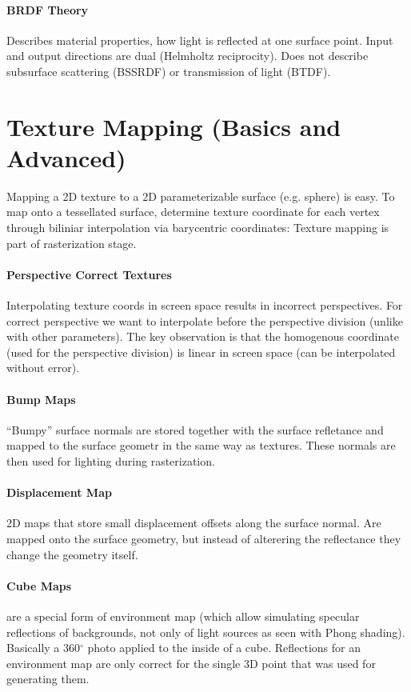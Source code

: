 \documentclass{article}
\begin{document}
\paragraph{BRDF Theory} Describes material properties, how light is reflected at one surface point. Input and output directions are dual (Helmholtz reciprocity). Does not describe subsurface scattering (BSSRDF) or transmission of light (BTDF).

\section{Texture Mapping (Basics and Advanced)}

Mapping a 2D texture to a 2D parameterizable surface (e.g. sphere) is easy. To map onto a tessellated surface, determine texture coordinate for each vertex through biliniar interpolation via barycentric coordinates: Texture mapping is part of rasterization stage.

\paragraph{Perspective Correct Textures} Interpolating texture coords in screen space results in incorrect perspectives. For correct perspective we want to interpolate before the perspective division (unlike with other parameters). The key observation is that the homogenous coordinate (used for the perspective division) is linear in screen space (can be interpolated without error).

\paragraph{Bump Maps} \enquote{Bumpy} surface normals are stored together with the surface refletance and mapped to the surface geometr in the same way as textures. These normals are then used for lighting during rasterization.

\paragraph{Displacement Map} 2D maps that store small displacement offsets along the surface normal. Are mapped onto the surface geometry, but instead of alterering the reflectance they change the geometry itself.

\paragraph{Cube Maps} are a special form of environment map (which allow simulating specular reflections of backgrounds, not only of light sources as seen with Phong shading). Basically a 360$^\circ$ photo applied to the inside of a cube. Reflections for an environment map are only correct for the single 3D point that was used for generating them.
\end{document}
